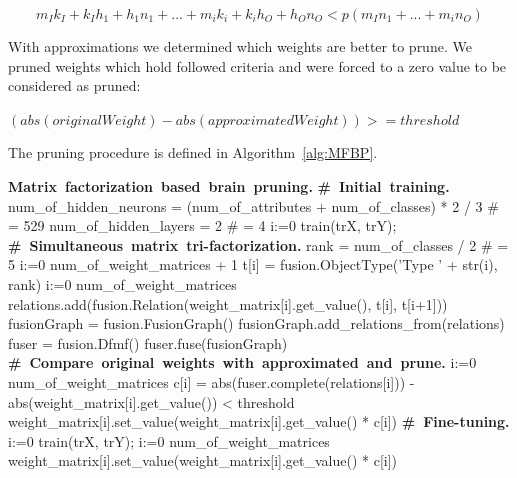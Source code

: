 \documentclass{article} %
\begin{document}
\begin{equation} \label{eq:2}
 m_Ik_I + k_Ih_1 + h_1n_1 + ... + m_ik_i + k_ih_O + h_On_O < p(m_In_1 + ... + m_in_O)
\end{equation}



With approximations we determined which weights are better to prune. We pruned
weights which hold followed criteria and were forced to a zero value to be
considered as pruned:

$(abs(originalWeight) - abs(approximatedWeight)) >= threshold$



The pruning procedure is defined in Algorithm~\ref{alg:MFBP}.


\begin{small}
\label{alg:MFBP}
\begin{program}
\mbox{\textbf{Matrix factorization based brain pruning.}}
\mbox{\textbf{\# Initial training.}}
  num\_of\_hidden\_neurons = (num\_of\_attributes + num\_of\_classes) * 2 / 3 \# = 529
  num\_of\_hidden\_layers = 2 \# = 4
  \FOR i:=0  \DO 
     train(trX, trY); 
  \OD
\mbox{\textbf{\# Simultaneous matrix tri-factorization.}}
  rank = num\_of\_classes / 2 \# = 5   
  \FOR i:=0 \TO num\_of\_weight\_matrices + 1 \DO
     t[i] = fusion.ObjectType('Type ' + str(i), rank)
  \OD
  \FOR i:=0 \TO num\_of\_weight\_matrices \DO
     relations.add(fusion.Relation(weight\_matrix[i].get\_value(), t[i], t[i+1])) 
  \OD
  fusionGraph = fusion.FusionGraph()
  fusionGraph.add\_relations\_from(relations)
  fuser = fusion.Dfmf()
  fuser.fuse(fusionGraph) 
\mbox{\textbf{\# Compare original weights with approximated and prune.}}
  \FOR i:=0 \TO num\_of\_weight\_matrices \DO
  	  c[i] = abs(fuser.complete(relations[i])) - abs(weight\_matrix[i].get\_value()) < threshold
      weight\_matrix[i].set\_value(weight\_matrix[i].get\_value() * c[i])
  \OD
\mbox{\textbf{\# Fine-tuning.}}
  \FOR i:=0  \DO 
     train(trX, trY); 
     \FOR i:=0 \TO num\_of\_weight\_matrices \DO
      weight\_matrix[i].set\_value(weight\_matrix[i].get\_value() * c[i])
     \OD     
  \OD
\end{program}
\end{small}
\end{document}
